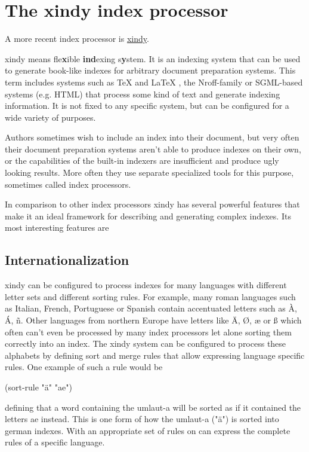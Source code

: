 \section{The xindy index processor}

A more recent index processor is \href{http://www.xindy.org}{xindy}. 

xindy means fle\textbf{x}ible \textbf{ind}exing s\textbf{y}stem. It is an indexing system that can be used to generate book-like indexes for arbitrary document preparation systems. This term includes systems such as TeX and LaTeX , the Nroff-family or SGML-based systems (e.g. HTML) that process some kind of text and generate indexing information. It is not fixed to any specific system, but can be configured for a wide variety of purposes.

Authors sometimes wish to include an index into their document, but very often their document preparation systems aren't able to produce indexes on their own, or the capabilities of the built-in indexers are insufficient and produce ugly looking results. More often they use separate specialized tools for this purpose, sometimes called index processors.

In comparison to other index processors xindy has several powerful features that make it an ideal framework for describing and generating complex indexes. Its most interesting features are

\subsection{Internationalization}

xindy can be configured to process indexes for many languages with different letter sets and different sorting rules. For example, many roman languages such as Italian, French, Portuguese or Spanish contain accentuated letters such as À, Á, ñ. Other languages from northern Europe have letters like Ä, Ø, æ or ß which often can't even be processed by many index processors let alone sorting them correctly into an index. The xindy system can be configured to process these alphabets by defining sort and merge rules that allow expressing language specific rules. One example of such a rule would be

(sort-rule "ä" "ae")

defining that a word containing the umlaut-a will be sorted as if it contained the letters ae instead. This is one form of how the umlaut-a ("ä") is sorted into german indexes. With an appropriate set of rules on can express the complete rules of a specific language.
\endinput




















